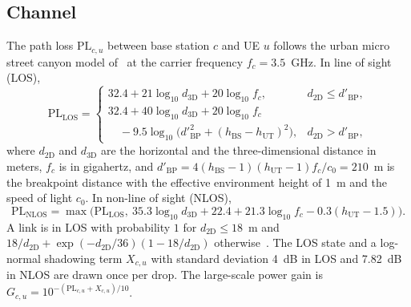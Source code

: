 \documentclass{ieeeaccess}
\begin{document}
\subsection{Channel}
The path loss $\text{PL}_{c,u}$ between base station $c$ and UE $u$ follows the urban micro street canyon model of~\cite[Table~7.4.1-1]{3gpp38901} at the carrier frequency $f_c = 3.5$~GHz. In line of sight (LOS),
\begin{equation}
\text{PL}_{\text{LOS}} =
\begin{cases}
32.4 + 21 \log_{10} d_{\text{3D}} + 20 \log_{10} f_c, & d_{\text{2D}} \le d'_{\text{BP}}, \\
32.4 + 40 \log_{10} d_{\text{3D}} + 20 \log_{10} f_c \\
\quad - 9.5 \log_{10}\bigl(d'^{2}_{\text{BP}} + (h_{\text{BS}} - h_{\text{UT}})^2\bigr), & d_{\text{2D}} > d'_{\text{BP}},
\end{cases}
\label{eq:pl_los}
\end{equation}
where $d_{\text{2D}}$ and $d_{\text{3D}}$ are the horizontal and the three-dimensional distance in meters, $f_c$ is in gigahertz, and $d'_{\text{BP}} = 4 (h_{\text{BS}} - 1)(h_{\text{UT}} - 1) f_c / c_0 = 210$~m is the breakpoint distance with the effective environment height of 1~m and the speed of light $c_0$. In non-line of sight (NLOS),
\begin{equation}
\text{PL}_{\text{NLOS}} = \max\bigl(\text{PL}_{\text{LOS}},\ 35.3 \log_{10} d_{\text{3D}} + 22.4 + 21.3 \log_{10} f_c - 0.3 (h_{\text{UT}} - 1.5)\bigr).
\label{eq:pl_nlos}
\end{equation}
A link is in LOS with probability $1$ for $d_{\text{2D}} \le 18$~m and $18/d_{\text{2D}} + \exp(-d_{\text{2D}}/36)(1 - 18/d_{\text{2D}})$ otherwise~\cite[Table~7.4.2-1]{3gpp38901}. The LOS state and a log-normal shadowing term $X_{c,u}$ with standard deviation 4~dB in LOS and 7.82~dB in NLOS are drawn once per drop. The large-scale power gain is $G_{c,u} = 10^{-(\text{PL}_{c,u} + X_{c,u})/10}$.
\end{document}
